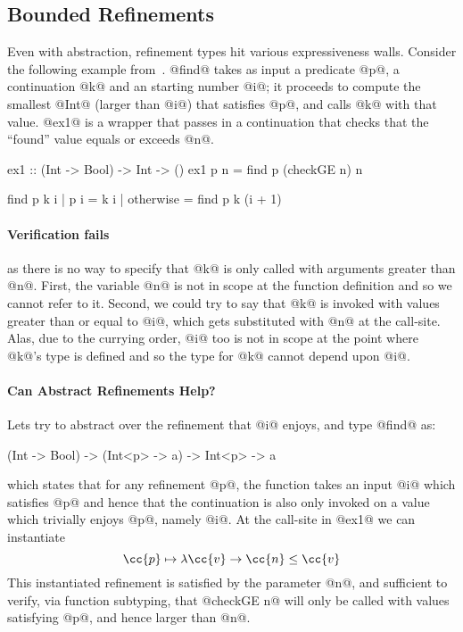 \subsection{Bounded Refinements}

Even with abstraction, refinement types hit various 
expressiveness walls. Consider the following example 
from~\cite{TerauchiPOPL13}. 
%
@find@ takes as input a predicate @p@, a continuation 
@k@ and an starting number @i@; it proceeds to compute
the smallest @Int@ (larger than @i@) that satisfies 
@p@, and calls @k@ with that value.
%
@ex1@ is a wrapper that passes in a continuation that
checks that the ``found'' value equals or exceeds @n@.

\begin{code}
    ex1 :: (Int -> Bool) -> Int -> ()
    ex1 p n = find p (checkGE n) n
    
    find p k i 
      | p i       = k i 
      | otherwise = find p k (i + 1)
\end{code}

\paragraph{Verification fails} as there is no way to specify that
@k@ is only called with arguments greater than @n@. 
%
First, the variable @n@ is not in scope at the function 
definition and so we cannot refer to it. 
%
Second, we could try to say that @k@ is invoked with values 
greater than or equal to @i@, which gets substituted with @n@
at the call-site. Alas, due to the currying order, @i@ too is 
not in scope at the point where @k@'s type is defined and so 
the type for @k@ cannot depend upon @i@.

\paragraph{Can Abstract Refinements Help?} Lets try to 
abstract over the refinement that @i@ enjoys, and 
type @find@ as:
%
\begin{code}
  (Int -> Bool) -> (Int<p> -> a) -> Int<p> -> a
\end{code}
%
which states that for any refinement @p@, the function takes 
an input @i@ which satisfies @p@ and hence that the continuation 
is also only invoked on a value which trivially enjoys @p@, namely @i@.
%
At the call-site in @ex1@ we can instantiate
\begin{equation}
\cc{p} \mapsto \lambda \cc{v} \rightarrow \cc{n} \leq \cc{v} \label{eq:inst:find}
\end{equation}
%
This instantiated refinement is satisfied by the parameter @n@, and
sufficient to verify, via function subtyping, that @checkGE n@ will
only be called with values satisfying @p@, and hence larger than @n@.

